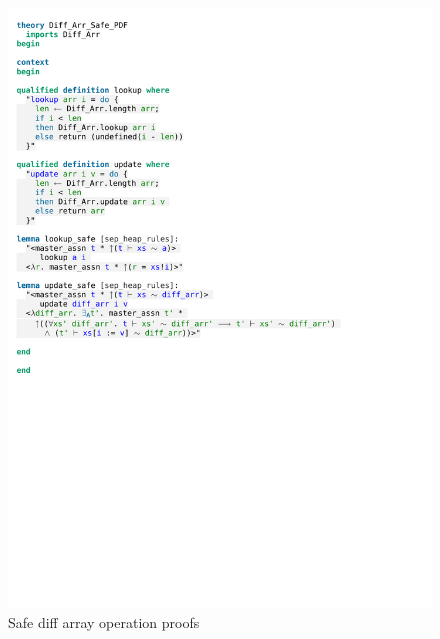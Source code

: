 \begin{figure}[htpb]
    \includegraphics[trim={0 13,4cm 0 11,2cm}, clip, width=1.00\textwidth]{figures/Theory_Diff_Arr_Safe.pdf}
    \caption[Safe diff array operation proofs]{Safe diff array operation proofs}
    \label{fig:diff_arr_safe_proof}
\end{figure}

